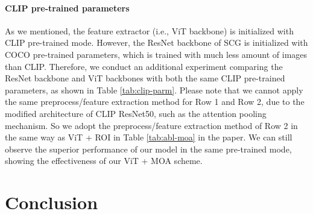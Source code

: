 \documentclass[10pt,twocolumn,letterpaper]{article}
\begin{document}
\begin{table}[t]
\begin{center}
\end{center}
\vspace{-0.2in}
\caption{Effect of CLIP pre-trained parameters. Experiment setting is the same as in Table \ref{tab:speed-memory}}
\label{tab:clip-parm}
\end{table}


\paragraph {CLIP pre-trained parameters}
As we mentioned, the feature extractor (i.e., ViT backbone) is initialized with CLIP pre-trained mode. However, the ResNet backbone of SCG is initialized with COCO pre-trained parameters, which is trained with much less amount of images than CLIP. Therefore, we conduct an additional experiment comparing the ResNet backbone and ViT backbones with both the same CLIP pre-trained parameters, as shown in Table \ref{tab:clip-parm}. Please note that we cannot apply the same preprocess/feature extraction method for Row 1 and Row 2, due to the modified architecture of CLIP ResNet50, such as the attention pooling mechanism. So we adopt the preprocess/feature extraction method of Row 2 in the same way
as ViT + ROI in Table \ref{tab:abl-moa} in the paper. We can still observe the superior performance of our model in the same pre-trained mode, showing the effectiveness of our ViT + MOA scheme. 









\section{Conclusion}
\label{sec:5}
\end{document}
